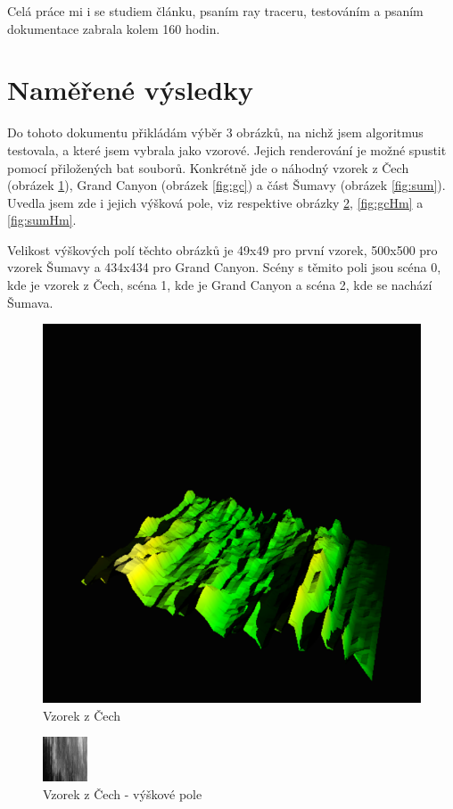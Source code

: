 \documentclass[report,11pt]{elsarticle}
\begin{document}
Celá práce mi i se studiem článku, psaním ray traceru, testováním a psaním dokumentace zabrala kolem 160 hodin.

\section{\label{SEC:Results}Naměřené výsledky}

Do tohoto dokumentu přikládám výběr 3 obrázků, na nichž jsem algoritmus testovala, a které jsem vybrala jako vzorové. Jejich renderování je možné spustit pomocí přiložených bat souborů. Konkrétně jde o náhodný vzorek z Čech (obrázek \ref{fig:sample}), Grand Canyon (obrázek \ref{fig:gc}) a část Šumavy (obrázek \ref{fig:sum}). Uvedla jsem zde i jejich výšková pole, viz respektive obrázky \ref{fig:sampleHm}, \ref{fig:gcHm} a \ref{fig:sumHm}.

Velikost výškových polí těchto obrázků je 49x49 pro první vzorek, 500x500 pro vzorek Šumavy a 434x434 pro Grand Canyon. Scény s těmito poli jsou scéna 0, kde je vzorek z Čech, scéna 1, kde je Grand Canyon a scéna 2, kde se nachází Šumava.


\begin{figure}[h]
\hfill\includegraphics[width=0.6\linewidth]{field.png}\hspace*{\fill}
\caption{Vzorek z Čech}
\label{fig:sample}
\end{figure}



\begin{figure}[h]
\hfill\includegraphics[width=0.3\linewidth]{vzorek.png}\hspace*{\fill}
\caption{Vzorek z Čech - výškové pole}
\label{fig:sampleHm}
\end{figure}
\end{document}
